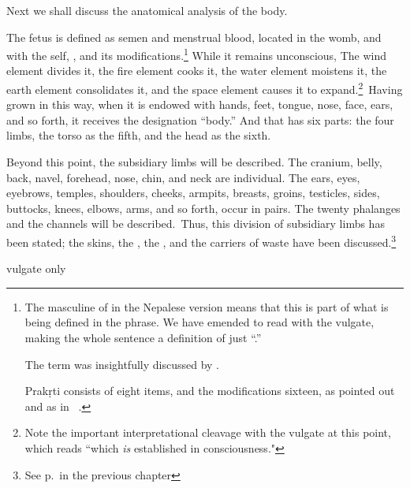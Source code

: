 \begin{translation}
  

      
\item[1]

Next we shall discuss the anatomical analysis of the body. 


\item[3]

The fetus is defined as semen and menstrual blood, located in the
womb, and  with the self, , and its modifications.\footnote{The masculine of
     in the Nepalese version means that this is part of
    what is being defined in the  phrase. We have emended to read
    with the vulgate, making the whole sentence a definition of just
    “.”
    
    The term  was insightfully discussed by
\citet{meul-2011}.

Prakṛti consists of eight items, and the modifications sixteen, as
 pointed out and as in \SS\ .} %
While it remains unconscious, The wind element divides it, the fire
element cooks it, the water element moistens it, the earth element
consolidates it, and the space element causes it to
expand.\footnote{Note the important interpretational cleavage with the
    vulgate at this point, which reads “which \emph{is} established in
    consciousness."} Having  grown in this way, when it is endowed with
    hands, feet, tongue, nose, face, ears, and so forth, it receives the
    designation “body.” And that has six parts: the four limbs, the torso
    as the fifth, and the head as the sixth.



\item[4] 

Beyond this point, the subsidiary limbs will be described. The
cranium, belly, back, navel, forehead, nose, chin, and neck are
individual. The ears, eyes, eyebrows, temples, shoulders, cheeks,
armpits, breasts, groins, testicles, sides, buttocks, knees, elbows,
arms, and so forth, occur in pairs. The twenty phalanges and the
channels will be described. Thus, this division of subsidiary limbs
has been stated; the skins, the , the
, and the carriers of waste  have been 
discussed.\footnote{See p.\,\pageref{skins-etc} in the previous chapter}


\item[5, 6 and 7]  vulgate only


\end{translation}
